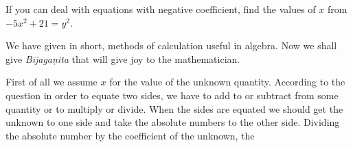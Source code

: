 \documentclass[]{article}
\begin{document}
{{If you can deal with equations with negative coefficient, find the
values of $x$ from $-5x^{2} + 21 =y^{2}$}.

\begin{quote}  {
}  \end{quote}

{We have given in short, methods of calculation useful in algebra. Now
we shall give \textit{Bījagaṇita} that will give joy to the mathematician.}

\vspace{15pt}
\begin{center}
\begin{Large}
 \label{eka}
{}
\end{Large}
\end{center}
\vspace{5pt}

\begin{quote}  {
}  \end{quote}

{First of all we assume $x$ for the value of the unknown quantity.
According to the question in order to equate two sides, we have to add
to or subtract from some quantity or to multiply or divide. When the
sides are equated we should get the unknown to one side and take the
absolute numbers to the other side. Dividing the absolute number by the
coefficient of the unknown, the }
\newpage
\large


}
\end{document}
